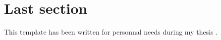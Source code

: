 \section{Last section}

This template has been written for personnal needs during my thesis \cite{Goffe11}.

